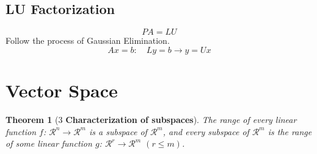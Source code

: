 \documentclass[10.5pt]{article}
\newtheorem{theo}{Theorem}
\begin{document}
\subsection{LU Factorization}
$$PA=LU$$
{Follow the process of Gaussian Elimination.}
$$Ax=b: \quad Ly=b \rightarrow y=Ux$$
\pagebreak

\section{Vector Space}
\begin{theo}[3 \textbf{Characterization of subspaces}]
The range of every linear function $f$: $\mathcal{R}^n \to \mathcal{R}^m$ is a subspace of $\mathcal{R}^m$, and every subspace of $\mathcal{R}^m$ is the range of some linear function $g$: $\mathcal{R}^r \to \mathcal{R}^m$ $(r\leq m)$.
\end{theo}
\end{document}
